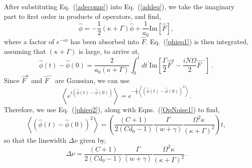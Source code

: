 \documentclass[aps,
twocolumn,
showpacs,
superscriptaddress,groupedaddress]{revtex4}
\begin{document}
After substituting Eq.~(\ref{adecomp}) into Eq.~(\ref{addeq}), we take
the imaginary part to first order in products of operators, and find,
\begin{equation}
\ddot{\hat{\phi}} =
-\frac{1}{2}(\kappa+\Gamma) \dot{\hat{\phi}} +
\frac{1}{a_0} \text{Im} [\hat{F}],
\label{phieq1}
\end{equation}
where a factor of $e^{-i\phi}$ has been absorbed into $\hat{F}$.
Eq.~(\ref{phieq1}) is then integrated, assuming that $(\kappa+\Gamma)$
is large, to arrive at,
\begin{equation}
\hat{\phi}(t) - \hat{\phi}(0) =
\frac{2}{a_0 (\kappa+\Gamma)}
\int_0^t dt^{\prime} \text{Im}
\left[ \frac{\Gamma}{2} \hat{F}^a-\frac{i N \Omega}{2} \hat{F}^-\right]\;.
\label{phieq2}
\end{equation}
Since $ \hat{F}^a$ and $\hat{F}^-$ are Gaussian, we can use
\begin{equation}
\left< e^{i(\hat{\phi}(t) - \hat{\phi}(0))} \right> =
e^{-\frac{1}{2}\left< ( \hat{\phi}(t) - \hat{\phi}(0) )^2 \right>}.
\end{equation}
Therefore, we use Eq.~(\ref{phieq2}), along with Eqns.~(\ref{OpNoise1})
to find,
\begin{equation}
\left<(\hat{\phi}(t) - \hat{\phi}(0))^2 \right> =
\left(\frac{(C+1)}{2(Cd_0-1)} \frac{\Gamma}{(w+\gamma)}
\frac{\Omega^2 \kappa}{(\kappa+\Gamma)^2}\right) t,
\end{equation}
so that the linewidth $\Delta \nu$ given by,
\begin{equation}
\Delta \nu =
\frac{(C+1)}{2(Cd_0-1)} \frac{\Gamma}{(w+\gamma)}
\frac{\Omega^2 \kappa}{(\kappa+\Gamma)^2}.
\label{LWHaken}
\end{equation}



\end{document}
